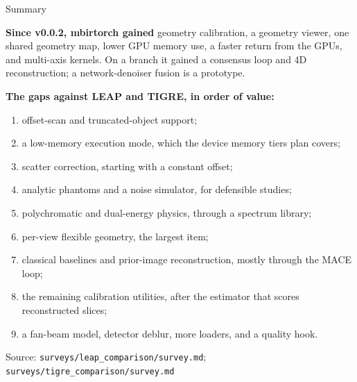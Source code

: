 \documentclass[aspectratio=169,10pt]{beamer}
\newcommand{\source}[1]{\par\vfill{\scriptsize\textcolor{inkGray}{Source: #1}\par}}
\begin{document}
\begin{frame}{Summary}
  \vspace{0pt}
  {\small
  \textbf{Since v0.0.2, mbirtorch gained} geometry calibration, a geometry
  viewer, one shared geometry map, lower GPU memory use, a faster return
  from the GPUs, and multi-axis kernels.  On a branch it gained a consensus
  loop and 4D reconstruction; a network-denoiser fusion is a
  prototype.\par\vspace{4pt}
  \textbf{The gaps against LEAP and TIGRE, in order of value:}
  \begin{enumerate}
    \item offset-scan and truncated-object support;
    \item a low-memory execution mode, which the device memory tiers plan
      covers;
    \item scatter correction, starting with a constant offset;
    \item analytic phantoms and a noise simulator, for defensible studies;
    \item polychromatic and dual-energy physics, through a spectrum library;
    \item per-view flexible geometry, the largest item;
    \item classical baselines and prior-image reconstruction, mostly through
      the MACE loop;
    \item the remaining calibration utilities, after the estimator that
      scores reconstructed slices;
    \item a fan-beam model, detector deblur, more loaders, and a quality hook.
  \end{enumerate}}
  \source{\texttt{surveys/leap\_comparison/survey.md};
  \texttt{surveys/tigre\_comparison/survey.md}}
\end{frame}
\end{document}

